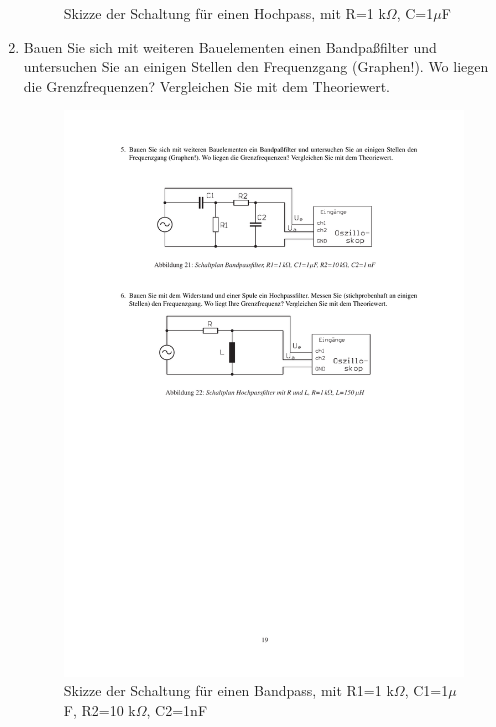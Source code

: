 \documentclass[12pt]{scrartcl}
\begin{document}
\begin{enumerate}
\begin{figure}[htbp]
  	\caption[Skizze der Schaltung für einen Hockpass, mit R=1 k$\Omega$, C=1$\mu$F]{Skizze der Schaltung für einen Hochpass, mit R=1 k$\Omega$, C=1$\mu$F\footnotemark}
  \label{fig:Hochpass}
\end{figure}
\newpage
{}
\item
Bauen Sie sich mit weiteren Bauelementen einen Bandpaßfilter und untersuchen Sie an einigen Stellen den Frequenzgang (Graphen!). Wo liegen die Grenzfrequenzen? Vergleichen Sie mit dem Theoriewert.
\begin{figure}[htbp] 
  \centering
    \includegraphics[trim = 20mm 220mm 1mm 30mm, clip, scale = 1]{bandpass_hochpass.pdf}
  	\caption[Skizze der Schaltung für einen Bandpass, mit R1=1 k$\Omega$, C1=1$\mu$F, R2=10 k$\Omega$, C2=1nF]{Skizze der Schaltung für einen Bandpass, mit R1=1 k$\Omega$, C1=1$\mu$F, R2=10 k$\Omega$, C2=1nF\footnotemark}

\end{figure}
\end{enumerate}
\end{document}
